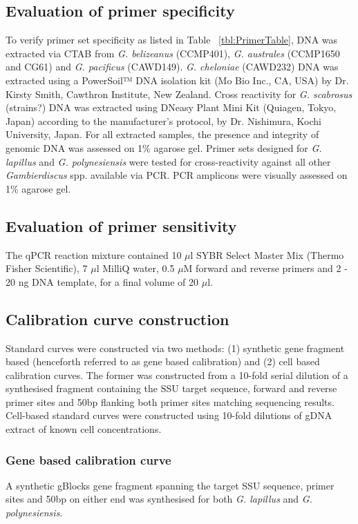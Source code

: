 \documentclass[12pt]{article}
\begin{document}
\subsection{Evaluation of primer specificity}
To verify primer set specificity as listed in Table ~\ref{tbl:PrimerTable}, DNA was extracted via CTAB from \emph{G. belizeanus} (CCMP401), \emph{G. australes} (CCMP1650 and CG61) and \emph{G. pacificus} (CAWD149). \emph{G. cheloniae} (CAWD232) DNA was extracted using a PowerSoil™ DNA isolation kit (Mo Bio Inc., CA, USA) by Dr. Kirsty Smith, Cawthron Institute, New Zealand. Cross reactivity for \emph{G. scabrosus} (strains?) DNA was extracted using DNeasy Plant Mini Kit (Quiagen, Tokyo, Japan) according to the manufacturer's protocol, by Dr. Nishimura, Kochi University, Japan. For all extracted samples, the presence and integrity of genomic DNA was assessed on 1\% agarose gel. Primer sets designed for \emph{G. lapillus} and \emph{G. polynesiensis} were tested for cross-reactivity against all other \emph{Gambierdiscus} spp. available via PCR. PCR amplicons were visually assessed on 1\% agarose gel.


\subsection{Evaluation of primer sensitivity}
The qPCR reaction mixture contained 10 $\mu$l SYBR Select Master Mix (Thermo Fisher Scientific), 7 $\mu$l MilliQ water, 0.5 $\mu$M forward and reverse primers and 2 - 20 ng DNA template, for a final volume of 20 $\mu$l.
\subsection{Calibration curve construction}
Standard curves were constructed via two methods: (1) synthetic gene fragment based (henceforth referred to as gene based calibration) and (2) cell based calibration curves. The former was constructed from a 10-fold serial dilution of a synthesised fragment containing the SSU target sequence, forward and reverse primer sites and 50bp flanking both primer sites matching sequencing results. Cell-based standard curves were constructed using 10-fold dilutions of gDNA extract of known cell concentrations.
\subsubsection{Gene based calibration curve}
A synthetic gBlocks gene fragment spanning the target SSU sequence, primer sites and 50bp on either end was synthesised for both \emph{G. lapillus} and \emph{G. polynesiensis}.
\end{document}
